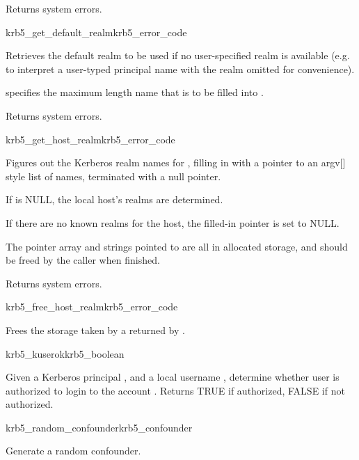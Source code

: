 Returns system errors.

\begin{funcdecl}{krb5_get_default_realm}{krb5_error_code}{\funcin}
\funcout
{}
\end{funcdecl}

Retrieves the default realm to be used if no user-specified realm is
available (e.g. to interpret a user-typed principal name with the
realm omitted for convenience).

 specifies the maximum length name that is to be filled into
.

Returns system errors.

\begin{funcdecl}{krb5_get_host_realm}{krb5_error_code}{\funcin}
\funcout
{}
\end{funcdecl}

Figures out the Kerberos realm names for , filling in
 with a
pointer to an argv[] style list of names, terminated with a null pointer.
 
If  is NULL, the local host's realms are determined.

If there are no known realms for the host, the filled-in pointer is set
to NULL.

The pointer array and strings pointed to are all in allocated storage,
and should be freed by the caller when finished.

Returns system errors.

\begin{funcdecl}{krb5_free_host_realm}{krb5_error_code}{\funcin}
\end{funcdecl}

Frees the storage taken by a  returned by
.

\begin{funcdecl}{krb5_kuserok}{krb5_boolean}{\funcin}
\end{funcdecl}

Given a Kerberos principal , and a local username
,
determine whether user is authorized to login to the account .
Returns TRUE if authorized, FALSE if not authorized.

\begin{funcdecl}{krb5_random_confounder}{krb5_confounder}{\funcvoid}
\end{funcdecl}

Generate a random confounder.
